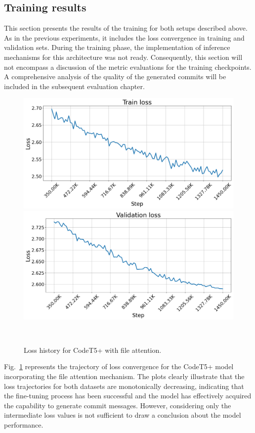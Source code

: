 \subsection{Training results}
This section presents the results of the training for both setups described above. As in the previous experiments, it includes the loss convergence in training and validation sets.
During the training phase, the implementation of inference mechanisms for this architecture was not ready. Consequently, this section will not encompass a discussion of the metric evaluations for the training checkpoints. A comprehensive analysis of the quality of the generated commits will be included in the subsequent evaluation chapter.

\begin{figure}[H]   
    \centering
    \includegraphics[scale=0.4]{figs/file_attn_train_loss.png}
    \includegraphics[scale=0.4]{figs/file_attn_val_loss.png}
    \caption{Loss history for CodeT5+ with file attention.}
    ~\label{fig:loss_hist_file_attn}
\end{figure}

Fig.~\ref{fig:loss_hist_file_attn} represents the trajectory of loss convergence for the CodeT5+ model incorporating the file attention mechanism.
The plots clearly illustrate that the loss trajectories for both datasets are monotonically decreasing, indicating that the fine-tuning process has been successful and the model has effectively acquired the capability to generate commit messages. However, considering only the intermediate loss values is not sufficient to draw a conclusion about the model performance.  

